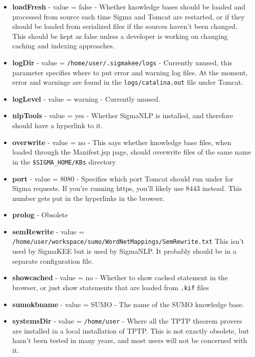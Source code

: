 \documentclass{book}
\begin{document}
\begin{itemize}
\item \textbf{loadFresh} - value = false - Whether knowledge bases should be
loaded and processed from source each time Sigma and Tomcat are restarted, or if
they should be loaded from serialized files if the sources haven't been changed.
This should be kept as false unless a developer is working on changing caching
and indexing approaches.

\item \textbf{logDir}  - value = \texttt{/home/user/.sigmakee/logs} - Currently
unused, this parameter specifies where to put error and warning log files.  At
the moment, error and warnings are found in the \texttt{logs/catalina.out} file
under Tomcat.

\item \textbf{logLevel}  - value = warning - Currently unused.

\item \textbf{nlpTools}  - value = yes - Whether SigmaNLP is installed, and therefore
should have a hyperlink to it.

\item \textbf{overwrite}  - value = no - This says whether knowledge base files, when
loaded through the Manifest.jsp page, should overwrite files of the same name in the
\texttt{\$SIGMA\_HOME/KBs} directory

  \item \textbf{port} - value = 8080 - Specifies which port Tomcat should run under
for Sigma requests.  If you're running https, you'll likely use 8443 instead.  This
number gets put in the hyperlinks in the browser.

  \item \textbf{prolog} - Obsolete

  \item \textbf{semRewrite} - value = \texttt{/home/user/workspace/sumo/WordNetMappings/SemRewrite.txt} 
This isn't used by SigmaKEE but is used by SigmaNLP.  It probably should be in a 
separate configuration file.

  \item \textbf{showcached} - value = no - Whether to show cached statement in the browser, or 
just show statements that are loaded from \texttt{.kif} files

  \item \textbf{sumokbname} - value = SUMO - The name of the SUMO knowledge base.

  \item \textbf{systemsDir} - value = \texttt{/home/user}  - Where all the TPTP theorem provers
are installed in a local installation of TPTP.  This is not exactly obsolete, but hasn't
been tested in many years, and most users will not be concerned with it.


\end{itemize}
\end{document}

